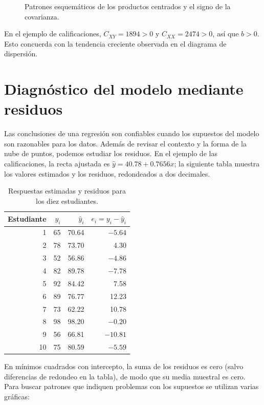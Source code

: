\begin{figure}[H]
\centering

\caption{Patrones esquemáticos de los productos centrados y el signo de la covarianza.}
\label{fig:signo-covarianza-regresion}
\end{figure}

En el ejemplo de calificaciones, $C_{XY}=1894>0$ y $C_{XX}=2474>0$, así que $b>0$. Esto concuerda con la tendencia creciente observada en el diagrama de dispersión.

\section{Diagnóstico del modelo mediante residuos}

Las conclusiones de una regresión son confiables cuando los supuestos del modelo son razonables para los datos. Además de revisar el contexto y la forma de la nube de puntos, podemos estudiar los residuos. En el ejemplo de las calificaciones, la recta ajustada es $\widehat{y}=40.78+0.7656x$; la siguiente tabla muestra los valores estimados y los residuos, redondeados a dos decimales.

\begin{table}[H]
\centering
\small
\renewcommand{\arraystretch}{1.08}
\begin{tabular}{|r|r|r|r|}
\hline
\textbf{Estudiante} & $y_i$ & $\widehat{y}_i$ & $e_i=y_i-\widehat{y}_i$ \\ \hline
1 & 65 & 70.64 & $-5.64$ \\ \hline
2 & 78 & 73.70 & 4.30 \\ \hline
3 & 52 & 56.86 & $-4.86$ \\ \hline
4 & 82 & 89.78 & $-7.78$ \\ \hline
5 & 92 & 84.42 & 7.58 \\ \hline
6 & 89 & 76.77 & 12.23 \\ \hline
7 & 73 & 62.22 & 10.78 \\ \hline
8 & 98 & 98.20 & $-0.20$ \\ \hline
9 & 56 & 66.81 & $-10.81$ \\ \hline
10 & 75 & 80.59 & $-5.59$ \\ \hline
\end{tabular}
\caption{Respuestas estimadas y residuos para los diez estudiantes.}
\label{tab:residuos-calificaciones}
\end{table}

En mínimos cuadrados con intercepto, la suma de los residuos es cero (salvo diferencias de redondeo en la tabla), de modo que su media muestral es cero. Para buscar patrones que indiquen problemas con los supuestos se utilizan varias gráficas:

